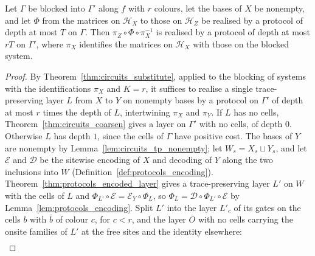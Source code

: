 \begin{theorem}
    \label{thm:protocols_block}
    \leanok
    Let $\Gamma$ be blocked into $\Gamma'$ along $f$ with $r$ colours, let the bases of $X$ be
    nonempty, and let $\Phi$ from the matrices on $\mathcal H_X$ to those on $\mathcal H_Z$ be
    realised by a protocol of depth at most $T$ on $\Gamma$. Then $\pi_Z\circ\Phi\circ\pi_X^{-1}$
    is realised by a protocol of depth at most $rT$ on $\Gamma'$, where $\pi_X$ identifies the
    matrices on $\mathcal H_X$ with those on the blocked system.
\end{theorem}
\begin{proof}\leanok
    By Theorem~\ref{thm:circuits_substitute}, applied to the blocking of systems with the
    identifications $\pi_X$ and $K=r$, it suffices to realise a single trace-preserving layer
    $L$ from $X$ to $Y$ on nonempty bases by a protocol on $\Gamma'$ of depth at most $r$
    times the depth of $L$, intertwining $\pi_X$ and $\pi_Y$. If $L$ has no cells,
    Theorem~\ref{thm:circuits_coarsen} gives a layer on $\Gamma'$ with no cells, of depth $0$.
    Otherwise $L$ has depth $1$, since the cells of $\Gamma$ have positive cost. The bases
    of $Y$ are nonempty by Lemma~\ref{lem:circuits_tp_nonempty}; let $W_s=X_s\sqcup Y_s$, and
    let $\mathcal E$ and $\mathcal D$ be the sitewise encoding of $X$ and decoding of $Y$
    along the two inclusions into $W$ (Definition~\ref{def:protocols_encoding}).
    Theorem~\ref{thm:protocols_encoded_layer} gives a trace-preserving layer $L'$ on $W$ with
    the cells of $L$ and $\Phi_{L'}\circ\mathcal E=\mathcal E_Y\circ\Phi_L$, so
    $\Phi_L=\mathcal D\circ\Phi_{L'}\circ\mathcal E$ by Lemma~\ref{lem:protocols_encoding}.
    Split $L'$ into the layer $L'_c$ of its gates on the cells $b$ with
    $\bar b$ of colour $c$, for $c<r$, and the layer $O$ with no cells carrying the onsite
    families of $L'$ at the free sites and the identity elsewhere:
    \begin{align}

\end{align}
\end{proof}
